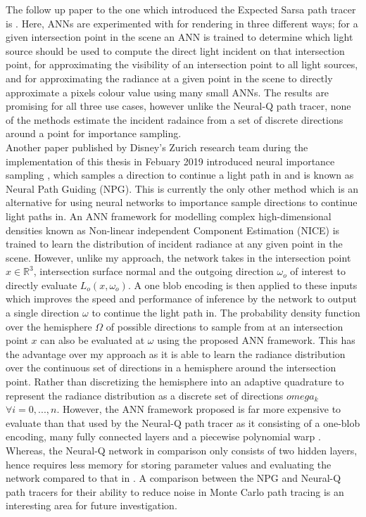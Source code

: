 \documentclass[../dissertation.tex]{subfiles}
\begin{document}
 The follow up paper to the one which introduced the Expected Sarsa path tracer \cite{dahm2017learning} is \cite{keller2019integral}. Here, ANNs are experimented with for rendering in three different ways; for a given intersection point in the scene an ANN is trained to determine which light source should be used to compute the direct light incident on that intersection point, for approximating the visibility of an intersection point to all light sources, and for approximating the radiance at a given point in the scene to directly approximate a pixels colour value using many small ANNs. The results are promising for all three use cases, however unlike the Neural-Q path tracer, none of the methods estimate the incident radaince from a set of discrete directions around a point for importance sampling.\\
 
 Another paper published by Disney's Zurich research team during the implementation of this thesis in Febuary 2019 introduced neural importance sampling \cite{muller2018neural}, which samples a direction to continue a light path in and is known as Neural Path Guiding (NPG). This is currently the only other method which is an alternative for using neural networks to importance sample directions to continue light paths in. An ANN framework for modelling complex high-dimensional densities known as Non-linear independent Component Estimation (NICE) \cite{dinh2014nice} is trained to learn the distribution of incident radiance at any given point in the scene. However, unlike my approach, the network takes in the intersection point $x \in \mathbb{R}^3$, intersection surface normal and the outgoing direction $\omega_o$ of interest to directly evaluate $L_o(x, \omega_o)$. A one blob encoding is then applied to these inputs which improves the speed and performance of inference by the network to output a single direction $\omega$ to continue the light path in. The probability density function over the hemisphere $\Omega$ of possible directions to sample from at an intersection point $x$ can also be evaluated at $\omega$ using the proposed ANN framework. This has the advantage over my approach as it is able to learn the radiance distribution over the continuous set of directions in a hemisphere around the intersection point. Rather than discretizing the hemisphere into an adaptive quadrature to represent the radiance distribution as a discrete set of directions $omega_k$ $\forall i = 0, ..., n$. However, the ANN framework proposed is far more expensive to evaluate than that used by the Neural-Q path tracer as it consisting of a one-blob encoding, many fully connected layers and a piecewise polynomial warp \cite{muller2018neural}. Whereas, the Neural-Q network in comparison only consists of two hidden layers, hence requires less memory for storing parameter values and evaluating the network compared to that in \cite{muller2018neural}. A comparison between the NPG and Neural-Q path tracers for their ability to reduce noise in Monte Carlo path tracing is an interesting area for future investigation.
\end{document}
